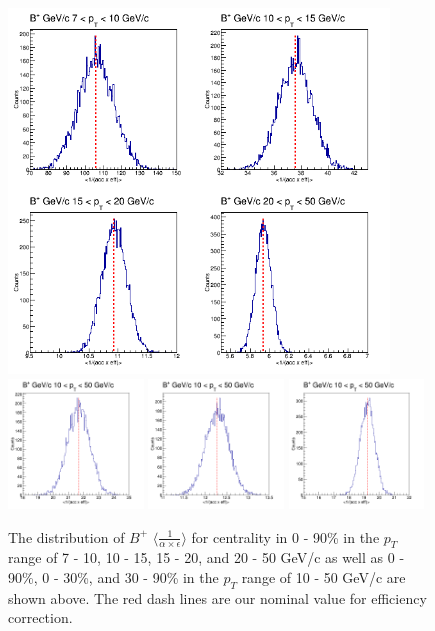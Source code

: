 \begin{figure}[h]
\begin{center}
\includegraphics[width= 0.90\textwidth]{Figures/Chapter4/BPStatSyst_0_90_4BinsPT.png}
\includegraphics[width= 0.32\textwidth]{Figures/Chapter4/BPStatSyst_0_30_1BinsPT.png}
\includegraphics[width= 0.32\textwidth]{Figures/Chapter4/BPStatSyst_30_90_1BinsPT.png}
\includegraphics[width= 0.32\textwidth]{Figures/Chapter4/BPStatSyst_0_90_1BinsPT.png}
\caption{The distribution of $B^+$ $\langle \frac{1}{\alpha \times \epsilon} \rangle$ for centrality in 0 - 90\% in the $p_T$ range of 7 - 10, 10 - 15, 15 - 20, and 20 - 50 GeV/c as well as 0 - 90\%, 0 - 30\%, and 30 - 90\% in the $p_T$ range of 10 - 50 GeV/c are shown above. The red dash lines are our nominal value for efficiency correction.}
\label{BPEffStatSyst}
\end{center}
\end{figure}


